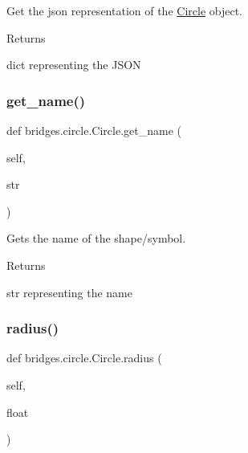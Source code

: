 Get the json representation of the \hyperlink{classbridges_1_1circle_1_1_circle}{Circle} object. 

\begin{DoxyReturn}{Returns}


dict representing the J\+S\+ON 
\end{DoxyReturn}
\mbox{\label{classbridges_1_1circle_1_1_circle_acacc4d8cc5f2db86cfcba61f31652003}} 
\subsubsection{\texorpdfstring{get\+\_\+name()}{get\_name()}}
{\footnotesize\ttfamily def bridges.\+circle.\+Circle.\+get\+\_\+name (\begin{DoxyParamCaption}\item[{}]{self,  }\item[{}]{str }\end{DoxyParamCaption})}



Gets the name of the shape/symbol. 

\begin{DoxyReturn}{Returns}


str representing the name 
\end{DoxyReturn}
\mbox{\label{classbridges_1_1circle_1_1_circle_abc82c7f3e8ac6112167b396839863319}} 
\subsubsection{\texorpdfstring{radius()}{radius()}\hspace{0.1cm}{\footnotesize\ttfamily [1/2]}}
{\footnotesize\ttfamily def bridges.\+circle.\+Circle.\+radius (\begin{DoxyParamCaption}\item[{}]{self,  }\item[{}]{float }\end{DoxyParamCaption})}



